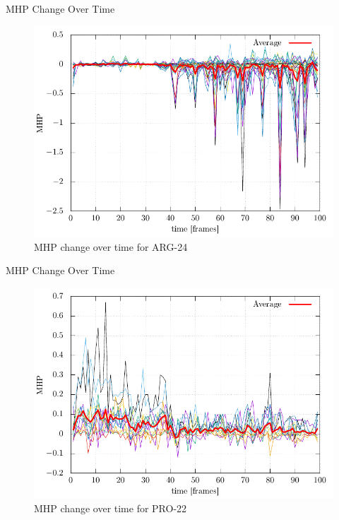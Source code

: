 \documentclass{beamer}
\begin{document}
\begin{frame}{MHP Change Over Time}
	\centering
	\begin{figure}[h!]
		\caption{MHP change over time for ARG-24}
		\includegraphics[scale=0.75]{ARG24_graph.pdf}
	\end{figure}
\end{frame}
\begin{frame}{MHP Change Over Time}
	\centering
	\begin{figure}[h!]
		\caption{MHP change over time for PRO-22}
		\includegraphics[scale=0.75]{PRO22_graph.pdf}
	\end{figure}
\end{frame}
\end{document}
